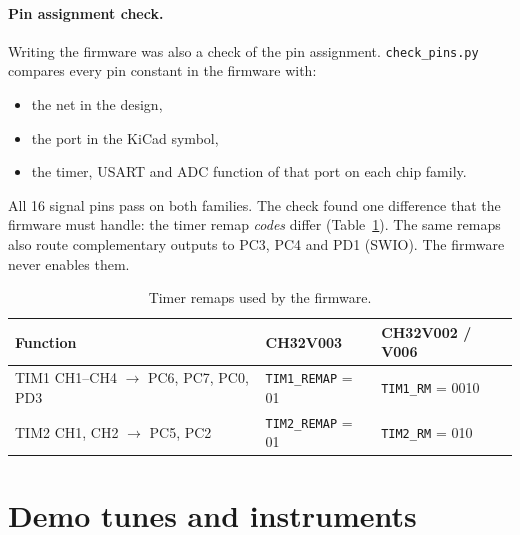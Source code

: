 \documentclass[11pt,a4paper]{article}
\newcommand{\file}[1]{\texttt{#1}}
\begin{document}
\paragraph{Pin assignment check.} Writing the firmware was also a check of the pin assignment.
\file{check\_pins.py} compares every pin constant in the firmware with:
\begin{itemize}
  \item the net in the design,
  \item the port in the KiCad symbol,
  \item the timer, USART and ADC function of that port on each chip family.
\end{itemize}
All 16 signal pins pass on both families. The check found one difference that the firmware must handle: the
timer remap \emph{codes} differ (Table~\ref{tab:remap}). The same remaps also route complementary outputs to
PC3, PC4 and PD1 (SWIO). The firmware never enables them.

\begin{table}[h]
\centering\small
\caption{Timer remaps used by the firmware.}\label{tab:remap}
\begin{tabular}{@{}l l l@{}}
\toprule
Function & CH32V003 & CH32V002 / V006 \\
\midrule
TIM1 CH1--CH4 $\to$ PC6, PC7, PC0, PD3 & \texttt{TIM1\_REMAP} = 01 & \texttt{TIM1\_RM} = 0010 \\
TIM2 CH1, CH2 $\to$ PC5, PC2 & \texttt{TIM2\_REMAP} = 01 & \texttt{TIM2\_RM} = 010 \\
\bottomrule
\end{tabular}
\end{table}

\section{Demo tunes and instruments}\label{sec:tunes}
\end{document}
